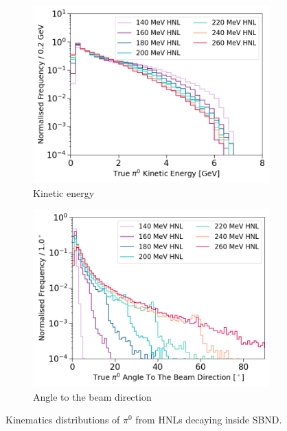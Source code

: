 \begin{figure}[ht!]
        \centering
        \begin{subfigure}[b]{0.495\textwidth}
            \centering
            \includegraphics[width=\textwidth]{pi0_energy}
            \caption{Kinetic energy}%
        \end{subfigure}
        \hfill
        \begin{subfigure}[b]{0.495\textwidth}  
            \centering 
            \includegraphics[width=\textwidth]{pi0_angle2Beam}
            \caption{Angle to the beam direction}%
        \end{subfigure}
        \caption[Kinematics Distributions of Neutral Pions From HNLs]{Kinematics distributions of $\pi^0$ from HNLs decaying inside SBND.}
        \label{fig:pi0_distribution}
\end{figure}


